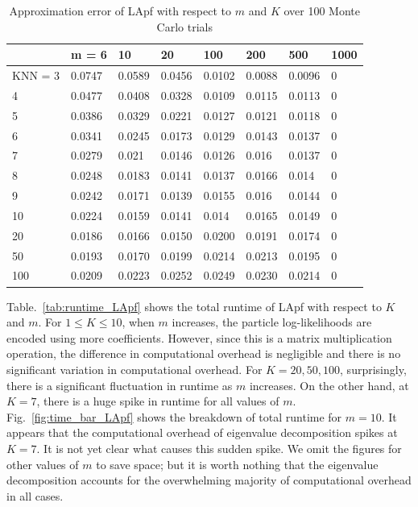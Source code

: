 \documentclass[10pt,letterpaper,final]{article}
\begin{document}
\begin{table}[h!]
\centering
\begin{tabular}{|l|l|l|l|l|l|l|l|}
\hline
        & m = 6  & 10     & 20     & 100    & 200    & 500    & 1000 \\ \hline
KNN = 3 & 0.0747 & 0.0589 & 0.0456 & 0.0102 & 0.0088 & 0.0096 & 0    \\ \hline
4       & 0.0477 & 0.0408 & 0.0328 & 0.0109 & 0.0115 & 0.0113 & 0    \\ \hline
5       & 0.0386 & 0.0329 & 0.0221 & 0.0127 & 0.0121 & 0.0118 & 0    \\ \hline
6       & 0.0341 & 0.0245 & 0.0173 & 0.0129 & 0.0143 & 0.0137 & 0    \\ \hline
7       & 0.0279 & 0.021  & 0.0146 & 0.0126 & 0.016  & 0.0137 & 0    \\ \hline
8       & 0.0248 & 0.0183 & 0.0141 & 0.0137 & 0.0166 & 0.014  & 0    \\ \hline
9       & 0.0242 & 0.0171 & 0.0139 & 0.0155 & 0.016  & 0.0144 & 0    \\ \hline
10      & 0.0224 & 0.0159 & 0.0141 & 0.014  & 0.0165 & 0.0149 & 0    \\ \hline
20      & 0.0186 & 0.0166 & 0.0150 & 0.0200 & 0.0191 & 0.0174         & 0    \\ \hline
50      & 0.0193 & 0.0170 & 0.0199 & 0.0214 & 0.0213 & 0.0195         & 0    \\ \hline
100     & 0.0209 & 0.0223 & 0.0252 & 0.0249 & 0.0230 & 0.0214         & 0 \\ \hline
\end{tabular}
\caption{Approximation error of LApf with respect to $m$ and $K$ over 100 Monte Carlo trials}
\label{tab:Approx_error_LApf}
\end{table}

Table.~\ref{tab:runtime_LApf} shows the total runtime of LApf with respect to $K$ and $m$. For $1\leq K \leq 10$, when $m$ increases, the particle log-likelihoods are encoded using more coefficients. However, since this is a matrix multiplication operation, the difference in computational overhead is negligible and there is no significant variation in computational overhead. For $K=20, 50, 100$, surprisingly, there is a significant fluctuation in runtime as $m$ increases. On the other hand, at $K=7$, there is a huge spike in runtime for all values of $m$. Fig.~\ref{fig:time_bar_LApf} shows the breakdown of total runtime for $m=10$. It appears that the computational overhead of eigenvalue decomposition spikes at $K=7$. It is not yet clear what causes this sudden spike. We omit the figures for other values of $m$ to save space; but it is worth nothing that the eigenvalue decomposition accounts for the overwhelming majority of computational overhead in all cases. 
\end{document}
